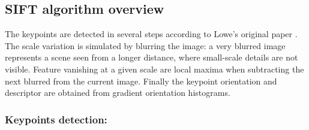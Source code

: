 \documentclass[preprint]{iucr}
\begin{document}
\subsection{SIFT algorithm overview}



The keypoints are detected in several steps according to Lowe's
original paper \cite{Lowe99}.
The scale variation is simulated by blurring the image:
a very blurred image represents a scene seen from a longer distance, where
small-scale details are not visible. Feature vanishing at a given scale are
local maxima when subtracting the next blurred from the current image. Finally
the keypoint orientation and descriptor are obtained from gradient orientation
histograms.


\subsubsection{Keypoints detection:}
\end{document}

